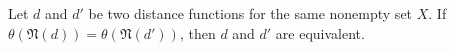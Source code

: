 Let $d$ and $d'$ be two distance functions for the same nonempty set $X$. If $\theta(\mathfrak{N}(d)) = \theta(\mathfrak{N}(d'))$, then $d$ and $d'$ are equivalent.
